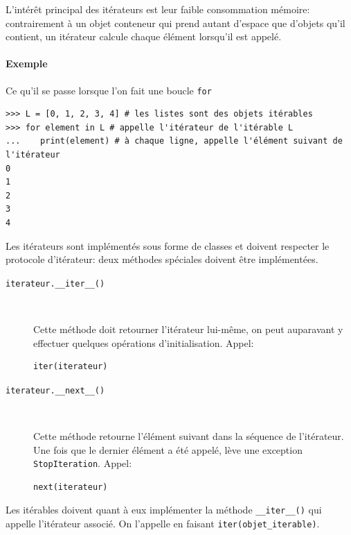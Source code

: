 \documentclass[a4paper, 10pt]{article}
\begin{document}
L'intérêt principal des itérateurs est leur faible consommation mémoire: contrairement à un objet conteneur qui prend autant d'espace que d'objets qu'il contient, un itérateur calcule chaque élément lorsqu'il est appelé.

\paragraph{Exemple} Ce qu'il se passe lorsque l'on fait une boucle \texttt{for}
\begin{verbatim}
>>> L = [0, 1, 2, 3, 4] # les listes sont des objets itérables
>>> for element in L # appelle l'itérateur de l'itérable L
...    print(element) # à chaque ligne, appelle l'élément suivant de l'itérateur
0
1
2
3
4
\end{verbatim}

Les itérateurs sont implémentés sous forme de classes et doivent respecter le protocole d'itérateur: deux méthodes spéciales doivent être implémentées.
\begin{description}
    \item[\texttt{iterateur.__iter__()}]~

    Cette méthode doit retourner l'itérateur lui-même, on peut auparavant y effectuer quelques opérations d’initialisation. Appel:
    \begin{verbatim}
iter(iterateur)
    \end{verbatim}

    \item[\texttt{iterateur.__next__()}]~

    Cette méthode retourne l'élément suivant dans la séquence de l'itérateur. Une fois que le dernier élément a été appelé, lève une exception \texttt{StopIteration}. Appel:
    \begin{verbatim}
next(iterateur)
    \end{verbatim}
\end{description}

Les itérables doivent quant à eux implémenter la méthode \texttt{__iter__()} qui appelle l'itérateur associé. On l'appelle en faisant \texttt{iter(objet_iterable)}.
\end{document}
